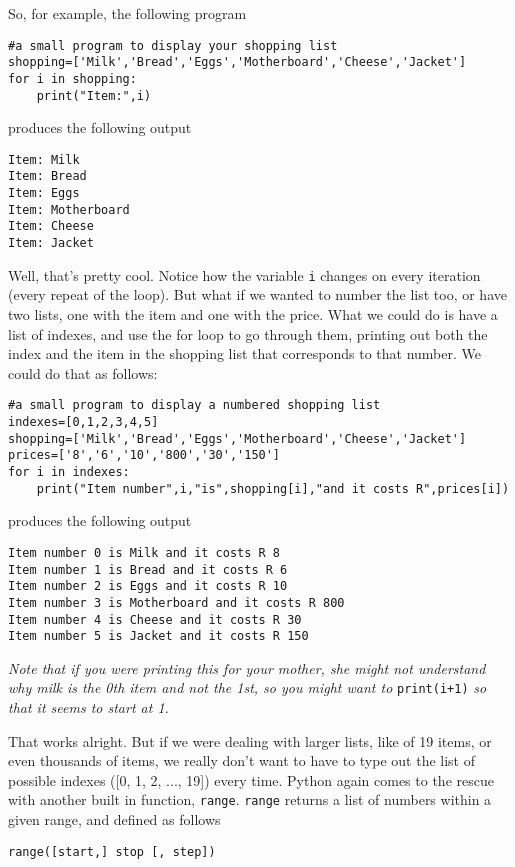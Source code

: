 So, for example, the following program
\begin{lstlisting}
#a small program to display your shopping list
shopping=['Milk','Bread','Eggs','Motherboard','Cheese','Jacket']
for i in shopping:
    print("Item:",i)
\end{lstlisting}

produces the following output
\begin{lstlisting}
Item: Milk
Item: Bread
Item: Eggs
Item: Motherboard
Item: Cheese
Item: Jacket
\end{lstlisting}

Well, that's pretty cool. Notice how the variable \texttt{i} changes on every iteration (every repeat of the loop). But what if we wanted to number the list too, or have two lists, one with the item and one with the price. What we could do is have a list of indexes, and use the for loop to go through them, printing out both the index and the item in the shopping list that corresponds to that number. We could do that as follows: 
\begin{lstlisting}
#a small program to display a numbered shopping list
indexes=[0,1,2,3,4,5]
shopping=['Milk','Bread','Eggs','Motherboard','Cheese','Jacket']
prices=['8','6','10','800','30','150']
for i in indexes:
    print("Item number",i,"is",shopping[i],"and it costs R",prices[i])
\end{lstlisting}   produces the following output  
\lstset{keywordstyle=\ttfamily}
\begin{lstlisting}
Item number 0 is Milk and it costs R 8
Item number 1 is Bread and it costs R 6
Item number 2 is Eggs and it costs R 10
Item number 3 is Motherboard and it costs R 800
Item number 4 is Cheese and it costs R 30
Item number 5 is Jacket and it costs R 150
\end{lstlisting}
\lstset{keywordstyle=\textbf}
\textit{Note that if you were printing this for your mother, she might not understand why milk is the 0th item and not the 1st, so you might want to} \texttt{print(i+1)} \textit{so that it seems to start at 1.}

 That works alright. But if we were dealing with larger lists,   like of 19 items, or even thousands of items, we really don't   want to have to type out the list of possible indexes ([0, 1, 2, ...,   19]) every time. Python again comes to the rescue with another built in   function, \texttt{range}.   \texttt{range} returns a list of numbers within a given range, and defined as   follows
\begin{lstlisting}
range([start,] stop [, step])
\end{lstlisting}

